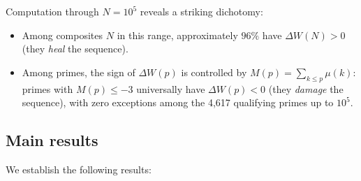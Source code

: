 \documentclass[11pt]{article}
\theoremstyle{definition}
\begin{document}
Computation through $N = 10^5$ reveals a striking dichotomy:
\begin{itemize}
  \item Among composites $N$ in this range, approximately $96\%$ have
    $\Delta W(N) > 0$ (they \emph{heal} the sequence).
  \item Among primes, the sign of $\Delta W(p)$ is controlled by
    $M(p) = \sum_{k \le p} \mu(k)$: primes with $M(p) \le -3$ universally
    have $\Delta W(p) < 0$ (they \emph{damage} the sequence), with
    zero exceptions among the 4,617 qualifying primes up to $10^5$.
\end{itemize}

\subsection{Main results}\label{sec:intro-results}

We establish the following results:
\end{document}
